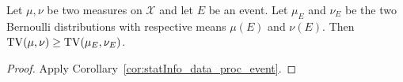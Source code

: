 \begin{lemma}
  \label{lem:tv_data_proc_event}
  Let $\mu, \nu$ be two measures on $\mathcal X$ and let $E$ be an event. Let $\mu_E$ and $\nu_E$ be the two Bernoulli distributions with respective means $\mu(E)$ and $\nu(E)$.
  Then $\operatorname{TV}(\mu, \nu) \ge \operatorname{TV}(\mu_E, \nu_E)$.
\end{lemma}

\begin{proof}
Apply Corollary~\ref{cor:statInfo_data_proc_event}.
\end{proof}
